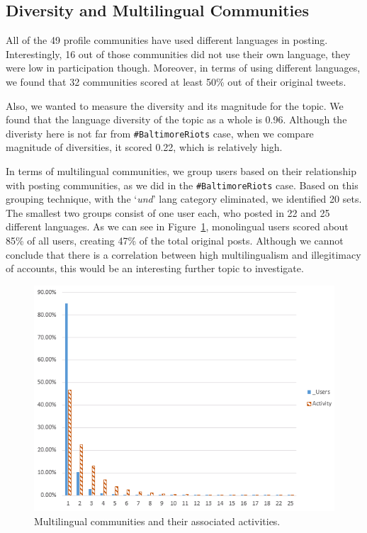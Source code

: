 \subsection{Diversity and Multilingual Communities}

All of the 49 profile communities have used different languages
in posting. Interestingly, 16 out of those communities did not use
their own language, they were low in participation though. Moreover,
in terms of using different languages, we found that 32 communities
scored at least 50\% out of their original tweets. 

Also, we wanted to measure the diversity and its magnitude for the topic. 
We found that the language diversity of the topic as a whole is 0.96. Although 
the diveristy here is not far from  {\texttt{\#BaltimoreRiots}} case, when we compare 
magnitude of diversities, it scored 0.22, which is relatively high.

In terms of multilingual communities, we group users based on their relationship with
posting communities, as we did in the {\texttt{\#BaltimoreRiots}} case.
Based on this grouping technique, with the `{\emph{und}}' lang category eliminated, we
identified 20 sets. The smallest two groups consist of one user each,
who posted in 22 and 25 different languages.  As we can see in
Figure~\ref{fig:multilingual}, monolingual users scored about 85\% of
all users, creating 47\% of the total original posts. Although we cannot conclude
that there is a correlation between high multilingualism and
illegitimacy of accounts, this would be an interesting further topic
to investigate.

\begin{figure}[htb]
\centering
\includegraphics[width=\columnwidth]{images/multilingualcommunities.png}
\caption{Multilingual communities and their associated activities.}
\label{fig:multilingual}
\end{figure}


